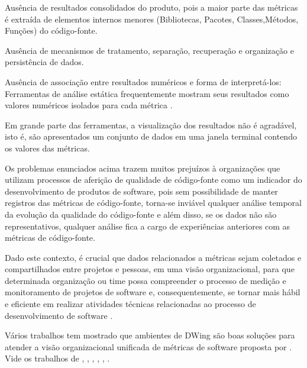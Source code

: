 
\begin{problems}
    \item Ausência de resultados consolidados do produto, pois a maior 
	parte das métricas é extraída de elementos internos menores (Bibliotecas, 
	Pacotes, Classes,Métodos, Funções) do código-fonte.
    
	\item Ausência de mecanismos de tratamento, separação, recuperação e 
	organização e persistência de dados. 
	
	\item Ausência de associação entre resultados numéricos e forma de 
	interpretá-los: Ferramentas de análise estática frequentemente mostram 
	seus resultados como valores numéricos isolados para cada métrica 
	\cite{Meirelles2013}. 
	
	\item Em grande parte das ferramentas, a visualização dos resultados não é 
	agradável, isto é, são apresentados um conjunto de dados em uma janela 
	terminal contendo os valores das métricas.
	
    \end{problems}
	
Os problemas enunciados acima trazem muitos prejuízos à organizações que 
utilizam processos de aferição de qualidade de código-fonte como um indicador do
desenvolvimento de produtos de software, pois sem possibilidade de manter 
registros das métricas de código-fonte, torna-se inviável qualquer análise 
temporal da evolução da qualidade do código-fonte e além disso, se os dados não 
são representativos, qualquer análise fica a cargo de experiências anteriores 
com as métricas de código-fonte.

Dado este contexto, é crucial que dados relacionados a métricas sejam coletados 
e compartilhados entre projetos e pessoas, em uma visão organizacional, 
para que determinada organização ou time possa compreender o processo de medição 
e monitoramento de projetos de software e, consequentemente, se 
tornar mais hábil e eficiente em realizar atividades técnicas relacionadas ao 
processo de desenvolvimento de software 
\cite{Chulani2003}.

Vários trabalhos tem mostrado que ambientes de DWing são boas soluções para 
atender a visão organizacional unificada de métricas de software proposta por 
. Vide os trabalhos de , 
, , , 
, .



